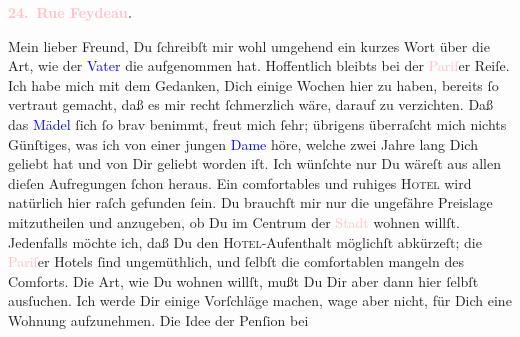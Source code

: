            \pstart
           \begin{otherlanguage}{french}\textcolor{gray}{\textbf{\textbf{\textcolor{pink}{24. Rue Feydeau}{}\ledrightnote{\textcolor{pink}{rue Feydeau}}.}}}\end{otherlanguage}\pend
           \pstart\center{}Mein lieber Freund,\pend\pstart
           Du ſchreibſt mir wohl umgehend ein kurzes Wort über die Art, wie der \textcolor{blue}{Vater}{} die \label{K_L02804-1v}\label{K_L02804-1h} aufgenommen hat. Hoffentlich bleibts bei der
                  \textcolor{pink}{Pariſ}{}\ledrightnote{\textcolor{pink}{Paris}}er Reiſe. Ich habe mich mit dem Gedanken,
               Dich einige Wochen hier zu haben, bereits ſo vertraut gemacht, daß es mir recht
               ſchmerzlich wäre, darauf zu verzichten. Daß das \textcolor{blue}{Mädel}{} ſich ſo brav benimmt, freut mich ſehr; übrigens
               überraſcht mich nichts Günſtiges, \strikeout{\textcolor{gray}{d}} was ich von einer jungen \textcolor{blue}{Dame}{} höre, welche zwei Jahre lang Dich geliebt hat und von Dir geliebt
               worden iſt. {\pb}Ich wünſchte nur Du wäreſt aus allen
               dieſen Aufregungen ſchon heraus.\pend
           \pstart
           Ein comfortables und ruhiges \textsc{Hotel} wird natürlich hier  raſch gefunden ſein. Du brauchſt mir nur die
               ungefähre  Preislage mitzutheilen und anzugeben,
               ob Du im Centrum der \textcolor{pink}{Stadt}{}
               wohnen willſt. Jedenfalls möchte ich, daß Du den \textsc{Hotel}-Aufenthalt möglichſt abkürzeſt; die \textcolor{pink}{Pariſ}{}\ledrightnote{\textcolor{pink}{Paris}}er Hotels ſind ungemüthlich, und ſelbſt die comfortablen mangeln des
               Comforts. Die Art, wie Du wohnen willſt, mußt Du Dir aber dann hier ſelbſt ausſuchen.
               Ich werde Dir einige Vorſchläge machen, wage aber nicht, für Dich {\pb}eine Wohnung aufzunehmen. Die Idee der Penſion bei
